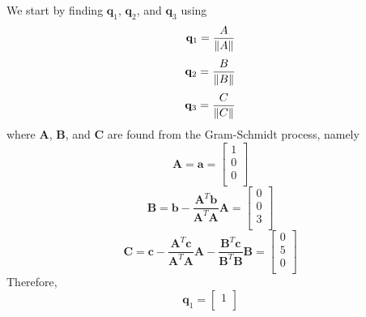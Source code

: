 \begin{mdframed}[style=MyFrame]
    We start by finding $\mathbf{q}_{1}$, $\mathbf{q}_{2}$, and
    $\mathbf{q}_{3}$ using
    \begin{equation}
        \mathbf{q}_{1} = \frac{A}{\norm{A}}
    \end{equation}
    \begin{equation}
        \mathbf{q}_{2} = \frac{B}{\norm{B}}
    \end{equation}
    \begin{equation}
        \mathbf{q}_{3} = \frac{C}{\norm{C}}
    \end{equation}
    where $\mathbf{A}$, $\mathbf{B}$, and $\mathbf{C}$ are found from the
    Gram-Schmidt process, namely
    \begin{equation}
        \mathbf{A} = \mathbf{a} = 
        \begin{bmatrix}
            1   \\
            0   \\
            0   \\
        \end{bmatrix}
    \end{equation}
    \begin{equation}
        \mathbf{B} = 
        \mathbf{\mathbf{b}} 
        - \frac{ \mathbf{A}^{T} \mathbf{b} }{ \mathbf{A}^{T}\mathbf{A} }\mathbf{A}
        =
        \begin{bmatrix}
            0   \\
            0   \\
            3   \\
        \end{bmatrix}
    \end{equation}
    \begin{equation}
        \mathbf{C} = 
        \mathbf{c} 
        - \frac{ \mathbf{A}^{T} \mathbf{c} }{ \mathbf{A}^{T}\mathbf{A} }\mathbf{A}
        - \frac{ \mathbf{B}^{T} \mathbf{c} }{ \mathbf{B}^{T}\mathbf{B} }\mathbf{B}
        =
        \begin{bmatrix}
            0   \\
            5   \\
            0   \\
        \end{bmatrix}
    \end{equation}
    Therefore,
    \begin{equation}
        \mathbf{q}_{1} =  
        \begin{bmatrix}
            1   \\

\end{bmatrix}
\end{equation}
\end{mdframed}
